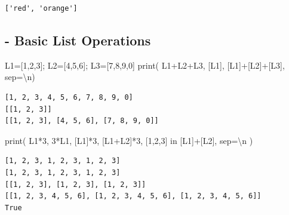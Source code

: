 \documentclass[
  letterpaper,
  DIV=11,
  numbers=noendperiod]{scrreprt}
\newenvironment{Shaded}{\begin{snugshade}}{\end{snugshade}}
\newcommand{\BuiltInTok}[1]{\textcolor[rgb]{0.00,0.23,0.31}{#1}}
\newcommand{\CharTok}[1]{\textcolor[rgb]{0.13,0.47,0.30}{#1}}
\newcommand{\DecValTok}[1]{\textcolor[rgb]{0.68,0.00,0.00}{#1}}
\newcommand{\KeywordTok}[1]{\textcolor[rgb]{0.00,0.23,0.31}{#1}}
\newcommand{\NormalTok}[1]{\textcolor[rgb]{0.00,0.23,0.31}{#1}}
\newcommand{\OperatorTok}[1]{\textcolor[rgb]{0.37,0.37,0.37}{#1}}
\newcommand{\StringTok}[1]{\textcolor[rgb]{0.13,0.47,0.30}{#1}}
\begin{document}
\begin{verbatim}
['red', 'orange']
\end{verbatim}

\subsection{- Basic List Operations}\label{basic-list-operations}

\begin{Shaded}
\begin{Highlighting}[]
\NormalTok{L1}\OperatorTok{=}\NormalTok{[}\DecValTok{1}\NormalTok{,}\DecValTok{2}\NormalTok{,}\DecValTok{3}\NormalTok{]}\OperatorTok{;}\NormalTok{ L2}\OperatorTok{=}\NormalTok{[}\DecValTok{4}\NormalTok{,}\DecValTok{5}\NormalTok{,}\DecValTok{6}\NormalTok{]}\OperatorTok{;}\NormalTok{ L3}\OperatorTok{=}\NormalTok{[}\DecValTok{7}\NormalTok{,}\DecValTok{8}\NormalTok{,}\DecValTok{9}\NormalTok{,}\DecValTok{0}\NormalTok{]}
\BuiltInTok{print}\NormalTok{(}
\NormalTok{    L1}\OperatorTok{+}\NormalTok{L2}\OperatorTok{+}\NormalTok{L3,}
\NormalTok{    [L1],}
\NormalTok{    [L1]}\OperatorTok{+}\NormalTok{[L2]}\OperatorTok{+}\NormalTok{[L3],}
\NormalTok{    sep}\OperatorTok{=}\StringTok{\textquotesingle{}}\CharTok{\textbackslash{}n}\StringTok{\textquotesingle{}}\NormalTok{)}
\end{Highlighting}
\end{Shaded}

\begin{verbatim}
[1, 2, 3, 4, 5, 6, 7, 8, 9, 0]
[[1, 2, 3]]
[[1, 2, 3], [4, 5, 6], [7, 8, 9, 0]]
\end{verbatim}

\begin{Shaded}
\begin{Highlighting}[]
\BuiltInTok{print}\NormalTok{(}
\NormalTok{    L1}\OperatorTok{*}\DecValTok{3}\NormalTok{,}
    \DecValTok{3}\OperatorTok{*}\NormalTok{L1,}
\NormalTok{    [L1]}\OperatorTok{*}\DecValTok{3}\NormalTok{,}
\NormalTok{    [L1}\OperatorTok{+}\NormalTok{L2]}\OperatorTok{*}\DecValTok{3}\NormalTok{,}
\NormalTok{    [}\DecValTok{1}\NormalTok{,}\DecValTok{2}\NormalTok{,}\DecValTok{3}\NormalTok{] }\KeywordTok{in}\NormalTok{ [L1]}\OperatorTok{+}\NormalTok{[L2],}
\NormalTok{    sep}\OperatorTok{=}\StringTok{\textquotesingle{}}\CharTok{\textbackslash{}n}\StringTok{\textquotesingle{}}
\NormalTok{)}
\end{Highlighting}
\end{Shaded}

\begin{verbatim}
[1, 2, 3, 1, 2, 3, 1, 2, 3]
[1, 2, 3, 1, 2, 3, 1, 2, 3]
[[1, 2, 3], [1, 2, 3], [1, 2, 3]]
[[1, 2, 3, 4, 5, 6], [1, 2, 3, 4, 5, 6], [1, 2, 3, 4, 5, 6]]
True
\end{verbatim}
\end{document}
